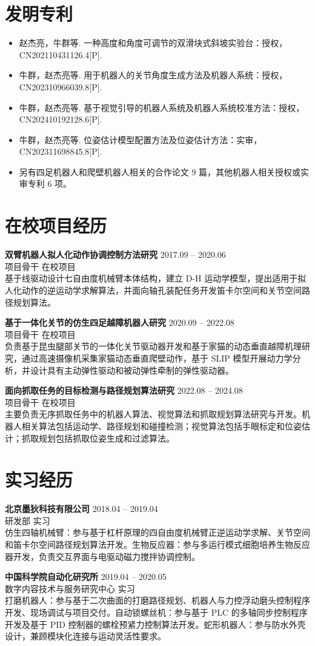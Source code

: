 \documentclass[11pt,a4paper]{article}
\newcommand{\entry}[4]{%
  \textbf{#1} \hfill #2\\
  {\color{textgray}#3} \hfill {#4}\\[-2pt]
}
\begin{document}
\section*{发明专利}
\begin{itemize}
	\item 赵杰亮，牛群等. 一种高度和角度可调节的双滑块式斜坡实验台：授权，CN202110431126.4[P].
	\item 牛群，赵杰亮等. 用于机器人的关节角度生成方法及机器人系统：授权，CN202310966039.8[P].
	\item 牛群，赵杰亮等. 基于视觉引导的机器人系统及机器人系统校准方法：授权，CN202410192128.6[P].
	\item 牛群，赵杰亮等. 位姿估计模型配置方法及位姿估计方法：实审，CN202311698845.8[P].
	\item 另有四足机器人和爬壁机器人相关的合作论文 9 篇，其他机器人相关授权或实审专利 6 项。
\end{itemize}

\section*{在校项目经历}
\entry{双臂机器人拟人化动作协调控制方法研究}{2017.09 -- 2020.06}{项目骨干}{在校项目}
基于线驱动设计七自由度机械臂本体结构，建立 D-H 运动学模型，提出适用于拟人化动作的逆运动学求解算法，并面向轴孔装配任务开发笛卡尔空间和关节空间路径规划算法。

\entry{基于一体化关节的仿生四足越障机器人研究}{2020.09 -- 2022.08}{项目骨干}{在校项目}
负责基于昆虫腿部关节的一体化关节驱动器开发和基于家猫的动态垂直越障机理研究，通过高速摄像机采集家猫动态垂直爬壁动作，基于 SLIP 模型开展动力学分析，并设计具有主动弹性驱动和被动弹性牵制的弹性驱动器。

\entry{面向抓取任务的目标检测与路径规划算法研究}{2022.08 -- 2024.08}{项目骨干}{在校项目}
主要负责无序抓取任务中的机器人算法、视觉算法和抓取规划算法研究与开发。机器人相关算法包括运动学、路径规划和碰撞检测；视觉算法包括手眼标定和位姿估计；抓取规划包括抓取位姿生成和过滤算法。

\section*{实习经历}
\entry{北京墨狄科技有限公司}{2018.04 -- 2019.04}{研发部}{实习}
仿生四轴机械臂：参与基于杠杆原理的四自由度机械臂正逆运动学求解、关节空间和笛卡尔空间路径规划算法开发。生物反应器：参与多运行模式细胞培养生物反应器开发，负责交互界面与电驱动磁力搅拌协调控制。

\entry{中国科学院自动化研究所}{2019.04 -- 2020.05}{数字内容技术与服务研究中心}{实习}
打磨机器人：参与基于二次曲面的打磨路径规划、机器人与力控浮动磨头控制程序开发、现场调试与项目交付。自动锁螺丝机：参与基于 PLC 的多轴同步控制程序开发及基于 PID 控制器的螺栓预紧力控制算法开发。蛇形机器人：参与防水外壳设计，兼顾模块化连接与运动灵活性要求。
\end{document}
